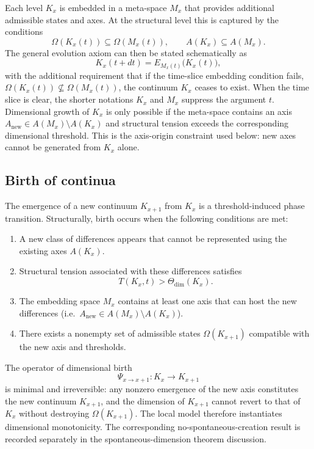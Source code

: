 Each level \(K_x\) is embedded in a meta-space \(M_x\) that provides additional admissible states and axes.
At the structural level this is captured by the conditions
\[
    \Omega(K_x(t)) \subseteq \Omega(M_x(t)), \qquad
    A(K_x) \subseteq A(M_x).
\]
The general evolution axiom can then be stated schematically as
\[
    K_x(t+dt) = E_{M_x(t)}\big(K_x(t)\big),
\]
with the additional requirement that if the time-slice embedding condition
fails, \(\Omega(K_x(t))\not\subseteq\Omega(M_x(t))\), the continuum \(K_x\)
ceases to exist. When the time slice is clear, the shorter notations \(K_x\)
and \(M_x\) suppress the argument \(t\).
Dimensional growth of \(K_x\) is only possible if the meta-space contains an
axis \(A_{\mathrm{new}}\in A(M_x)\setminus A(K_x)\) and structural tension
exceeds the corresponding dimensional threshold. This is the axis-origin
constraint used below: new axes cannot be generated from \(K_x\) alone.

\subsection{Birth of continua}

The emergence of a new continuum \(K_{x+1}\) from \(K_x\) is a threshold-induced phase transition.
Structurally, birth occurs when the following conditions are met:

\begin{enumerate}
    \item A new class of differences appears that cannot be represented using the existing axes \(A(K_x)\).
    \item Structural tension associated with these differences satisfies
          \[
              T(K_x,t) > \Theta_{\mathrm{dim}}(K_x).
          \]
    \item The embedding space \(M_x\) contains at least one axis that can host the new differences (i.e.\ \(A_{\mathrm{new}} \in A(M_x) \setminus A(K_x)\)).
    \item There exists a nonempty set of admissible states \(\Omega(K_{x+1})\) compatible with the new axis and thresholds.
\end{enumerate}

The operator of dimensional birth
\[
    \Psi_{x\to x+1}: K_x \to K_{x+1}
\]
is minimal and irreversible: any nonzero emergence of the new axis constitutes the new continuum \(K_{x+1}\), and the dimension of \(K_{x+1}\) cannot revert to that of \(K_x\) without destroying \(\Omega(K_{x+1})\).
The local model therefore instantiates dimensional monotonicity. The
corresponding no-spontaneous-creation result is recorded separately in
the spontaneous-dimension theorem discussion.

